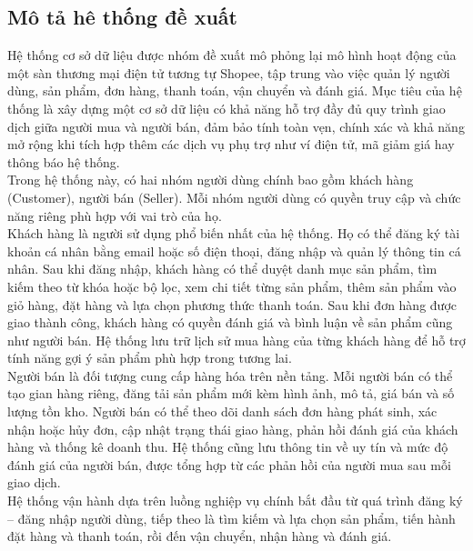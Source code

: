 \fontsize{11.5pt}{13pt}\selectfont

\setlength{\leftmargini}{50pt}
\subsection{Mô tả hê thống đề xuất}
\hspace*{2em} Hệ thống cơ sở dữ liệu được nhóm đề xuất mô phỏng lại mô hình hoạt động của một sàn thương mại điện tử tương tự Shopee,
 tập trung vào việc quản lý người dùng, sản phẩm, đơn hàng, thanh toán, vận chuyển và đánh giá. 
 Mục tiêu của hệ thống là xây dựng một cơ sở dữ liệu có khả năng hỗ trợ đầy đủ quy trình giao dịch giữa người mua và 
 người bán, đảm bảo tính toàn vẹn, chính xác và khả năng mở rộng khi tích hợp thêm các dịch vụ phụ trợ như ví điện tử, 
 mã giảm giá hay thông báo hệ thống. \\
 \hspace*{2em} Trong hệ thống này, có hai nhóm người dùng chính bao gồm khách hàng (Customer), người bán (Seller). 
 Mỗi nhóm người dùng có quyền truy cập và chức năng riêng phù hợp với vai trò của họ. \\
\hspace*{2em} Khách hàng là người sử dụng phổ biến nhất của hệ thống. Họ có thể đăng ký tài khoản cá nhân bằng email hoặc 
số điện thoại, đăng nhập và quản lý thông tin cá nhân. Sau khi đăng nhập, khách hàng có thể duyệt danh mục sản phẩm, 
tìm kiếm theo từ khóa hoặc bộ lọc, xem chi tiết từng sản phẩm, thêm sản phẩm vào giỏ hàng, đặt hàng và 
lựa chọn phương thức thanh toán. Sau khi đơn hàng được giao thành công, khách hàng có quyền đánh giá và 
bình luận về sản phẩm cũng như người bán. Hệ thống lưu trữ lịch sử mua hàng của từng khách hàng để hỗ trợ tính năng 
gợi ý sản phẩm phù hợp trong tương lai. \\
\hspace*{2em} Người bán là đối tượng cung cấp hàng hóa trên nền tảng. Mỗi người bán có thể tạo gian hàng riêng, 
đăng tải sản phẩm mới kèm hình ảnh, mô tả, giá bán và số lượng tồn kho. 
Người bán có thể theo dõi danh sách đơn hàng phát sinh, xác nhận hoặc hủy đơn, cập nhật trạng thái giao hàng, 
phản hồi đánh giá của khách hàng và thống kê doanh thu. Hệ thống cũng lưu thông tin về uy tín và 
mức độ đánh giá của người bán, được tổng hợp từ các phản hồi của người mua sau mỗi giao dịch. \\
\hspace*{2em} Hệ thống vận hành dựa trên luồng nghiệp vụ chính bắt đầu từ quá trình đăng ký – đăng nhập người dùng, 
tiếp theo là tìm kiếm và lựa chọn sản phẩm, tiến hành đặt hàng và thanh toán, rồi đến vận chuyển, nhận hàng và đánh giá.
